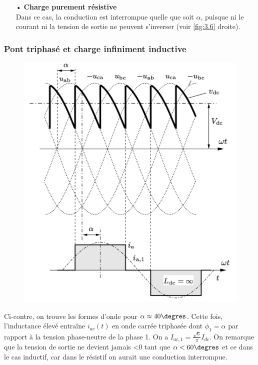 					\begin{itemize}
					\item[•] \textbf{Charge purement résistive}\\
					Dans ce cas, la conduction est interrompue quelle que soit $\alpha$, puisque ni le courant ni la tension de sortie ne peuvent s'inverser (voir \autoref{fig:3.6} droite). 
					\end{itemize}
					
				\subsubsection{Pont triphasé et charge infiniment inductive}
					\begin{figure}
					\vspace{-5mm}
					\includegraphics[scale=0.28]{ch3/7}
					\end{figure}
					Ci-contre, on trouve les formes d'onde pour $\alpha \approx 40\degres$. Cette fois, l'inductance élevé entraîne $i_{ac}(t)$ en onde carrée triphasée dont $\phi _1 = \alpha$ par rapport à la tension phase-neutre de la phase 1. On a $I_{ac,1} = \frac{\sqrt{6}}{\pi}I_{dc}$. On remarque que la tension de sortie ne devient jamais <0 tant que $\alpha < 60\degres$ et ce dans le cas inductif, car dans le résistif on aurait une conduction interrompue. 
					
